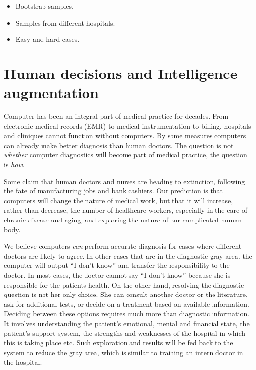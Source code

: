 \documentclass[11pt]{pnas-new}
\begin{document}
\begin{itemize}
  \item Bootstrap samples.
  \item Samples from different hospitals.
  \item Easy and hard cases.
  \end{itemize}

  \section{Human decisions and Intelligence augmentation}

  Computer {\color{blue}has been} an integral part of medical practice {\color{blue}for decades}. From
  {\color{blue}electronic} medical records (EMR) to medical instrumentation to billing,
  hospitals and cliniques cannot function without computers. By some
  measures computers can already make better diagnosis than human
  doctors. The question is not {\em whether} computer diagnostics will
  become part of medical practice, the question is {\em how}.

  Some claim that human doctors and nurses are heading to extinction,
  following the fate of manufacturing jobs and bank cashiers.  Our prediction is
  that computers will change the nature of medical work, but that it
  will increase, rather than decrease, the number of healthcare
  workers, especially in the care of chronic disease and aging{\color{blue}, and exploring the nature of our complicated human body}. 

  We believe computers {\em can} perform accurate diagnosis for cases where
  different doctors are likely to agree. In other cases {\color{blue}that are in the}
  diagnostic gray area, the computer will output ``I don't know'' and
  transfer the responsibility to the doctor. In most cases, the doctor
  cannot say ``I don't know'' because she is responsible for the
  patients health. On the other hand, resolving the diagnostic
  question is not her only choice. She can consult another doctor or
  the literature, ask for additional tests, or decide on a treatment
  based on available information. Deciding between these options requires much
  more than diagnostic information. It involves understanding the
  patient's emotional, mental and financial state, the patient's
  support system, the strengths and weaknesses of the hospital in
  which this is taking place etc. {\color{blue}Such exploration and results will be fed back to the system to reduce the gray area, which is similar to training an intern doctor in the hospital.}
\end{document}
